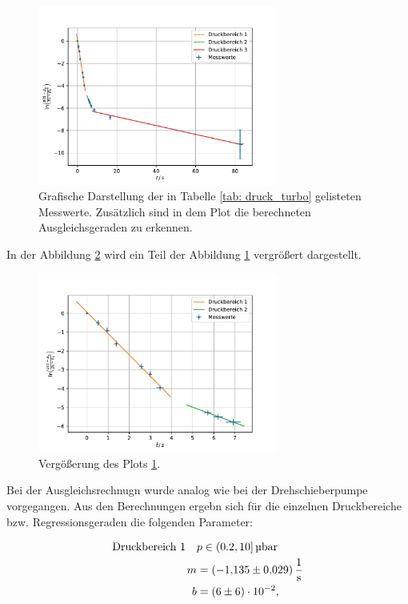 \FloatBarrier
\begin{figure}[h]
  \centering
  \includegraphics[width=0.7\textwidth]{../Messdaten/plots/turbo/druckplot_turbo.pdf}
  \caption{Grafische Darstellung der in Tabelle \ref{tab: druck_turbo} gelisteten Messwerte. Zusätzlich sind in dem Plot die berechneten Ausgleichsgeraden zu erkennen.}
  \label{fig: druck_turbo}
\end{figure}
\FloatBarrier
In der Abbildung \ref{fig: druck_turbo_zoom} wird ein Teil der Abbildung \ref{fig: druck_turbo} vergrößert dargestellt.

\FloatBarrier
\begin{figure}[h]
  \centering
  \includegraphics[width=0.7\textwidth]{../Messdaten/plots/turbo/druckplot_turbo_zoom.pdf}
  \caption{Vergößerung des Plots \ref{fig: druck_turbo}.}
  \label{fig: druck_turbo_zoom}
\end{figure}
\FloatBarrier
Bei der Ausgleichsrechnugn wurde analog wie bei der Drehschieberpumpe vorgegangen.
Aus den Berechnungen ergebn sich für die einzelnen Druckbereiche bzw. Regressionsgeraden die
folgenden Parameter:

\begin{align}
  \label{eq: regression_turbo_druck_1}
  \begin{aligned}
  \text{Druckbereich 1} \quad  &p\in(0.2,10]\,\si{\micro\bar}  \\
  m&=\SI{-1.135\pm0.029 }{\per\second} \\
  b&=\num{ 6 \pm 6 e-2 },
\end{aligned}
\end{align}

